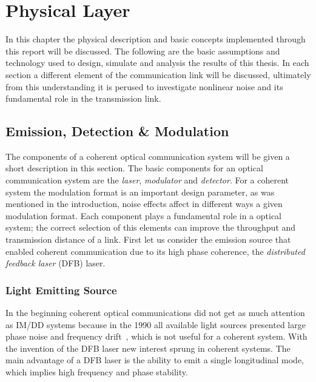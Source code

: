 \chapter{Physical Layer}\label{ch:Phsic}
In this chapter the physical description and basic concepts implemented through this report will be discussed. The following are the basic assumptions and technology used to design, simulate and analysis the results of this thesis. In each section a different element of the communication link will be discussed, ultimately from this understanding it is perused to investigate nonlinear noise and its fundamental role in the transmission link. 
\section{Emission, Detection \& Modulation}
The components of a coherent optical communication system will be given a short description in this section. The basic components  for an optical communication system are the  \textit{laser}, \textit{modulator} and \textit{detector}. For a coherent system the modulation format is an important design parameter, as was mentioned in the introduction, noise effects affect in different ways a given modulation format. Each component plays a fundamental role in a optical system; the correct selection of this elements can improve the throughput and transmission distance of a link. First let us consider the emission source that enabled coherent communication due to its high phase coherence, the \textit{distributed feedback laser} (DFB) laser.  

\subsection{Light Emitting Source }

In the beginning coherent optical communications  did not get as much attention as IM/DD systems because in the 1990 all available  light sources presented large phase noise and frequency drift~\cite{kikuchi2010coherent}, which is not useful for a coherent system. With the invention of the DFB laser new interest sprung in coherent systems. The main advantage of a DFB laser is the ability to emit a single longitudinal mode, which implies high frequency and phase stability.
 
